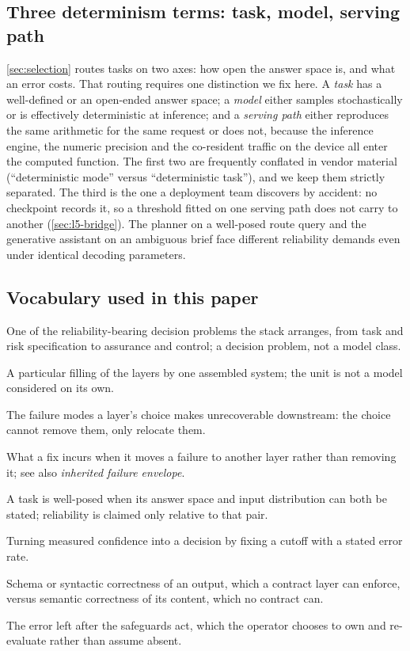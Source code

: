 \subsection{Three determinism terms: task, model, serving path}
\label{sec:determinism}
\cref{sec:selection} routes tasks on two axes: how open the answer space is, and what an error
costs. That routing requires one distinction we fix here. A \emph{task} has a well-defined or an
open-ended answer space; a \emph{model} either samples stochastically or is effectively
deterministic at inference; and a \emph{serving path} either reproduces the same arithmetic for
the same request or does not, because the inference engine, the numeric precision and the
co-resident traffic on the device all enter the computed function.
The first two are frequently conflated in vendor material (``deterministic mode'' versus
``deterministic task''), and we keep them strictly separated. The third is the one a deployment
team discovers by accident: no checkpoint records it, so a threshold fitted on one serving path
does not carry to another (\cref{sec:l5-bridge}). The planner on a well-posed route
query and the generative assistant on an ambiguous brief face different reliability demands
even under identical decoding parameters.

\subsection{Vocabulary used in this paper}
\begin{description}[leftmargin=1.5em, itemsep=1pt]
\item[Layer.] One of the reliability-bearing decision problems the stack arranges, from task and
risk specification to assurance and control; a decision problem, not a model class.
\item[Stack instance.] A particular filling of the layers by one assembled system; the unit is
not a model considered on its own.
\item[Inherited failure envelope.] The failure modes a layer's choice makes unrecoverable
downstream: the choice cannot remove them, only relocate them.
\item[Reliability debt.] What a fix incurs when it moves a failure to another layer rather than
removing it; see also \emph{inherited failure envelope}.
\item[Well-posedness.] A task is well-posed when its answer space and input distribution can both
be stated; reliability is claimed only relative to that pair.
\item[Selective prediction.] Turning measured confidence into a decision by fixing a cutoff with a
stated error rate.
\item[Validity versus truth.] Schema or syntactic correctness of an output, which a contract layer
can enforce, versus semantic correctness of its content, which no contract can.
\item[Residual.] The error left after the safeguards act, which the operator chooses to own and
re-evaluate rather than assume absent.
\end{description}
